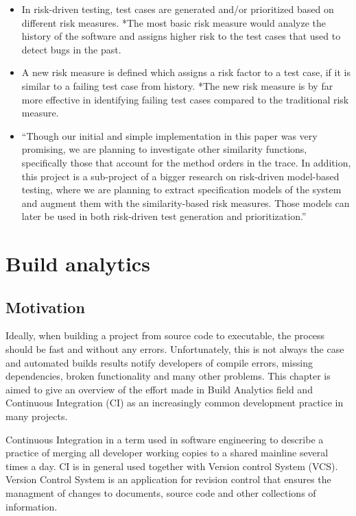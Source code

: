 \documentclass[]{book}
\providecommand{\tightlist}{%
  \setlength{\itemsep}{0pt}\setlength{\parskip}{0pt}}
\begin{document}
\begin{itemize}
\tightlist
\item
  In risk-driven testing, test cases are generated and/or prioritized
  based on different risk measures. *The most basic risk measure would
  analyze the history of the software and assigns higher risk to the
  test cases that used to detect bugs in the past.
\item
  A new risk measure is defined which assigns a risk factor to a test
  case, if it is similar to a failing test case from history. *The new
  risk measure is by far more effective in identifying failing test
  cases compared to the traditional risk measure.
\item
  ``Though our initial and simple implementation in this paper was very
  promising, we are planning to investigate other similarity functions,
  specifically those that account for the method orders in the trace. In
  addition, this project is a sub-project of a bigger research on
  risk-driven model-based testing, where we are planning to extract
  specification models of the system and augment them with the
  similarity-based risk measures. Those models can later be used in both
  risk-driven test generation and prioritization.''
\end{itemize}

\chapter{Build analytics}\label{build-analytics}

\section{Motivation}\label{motivation-1}

Ideally, when building a project from source code to executable, the
process should be fast and without any errors. Unfortunately, this is
not always the case and automated builds results notify developers of
compile errors, missing dependencies, broken functionality and many
other problems. This chapter is aimed to give an overview of the effort
made in Build Analytics field and Continuous Integration (CI) as an
increasingly common development practice in many projects.

Continuous Integration in a term used in software engineering to
describe a practice of merging all developer working copies to a shared
mainline several times a day. CI is in general used together with
Version control System (VCS). Version Control System is an application
for revision control that ensures the managment of changes to documents,
source code and other collections of information.
\end{document}
